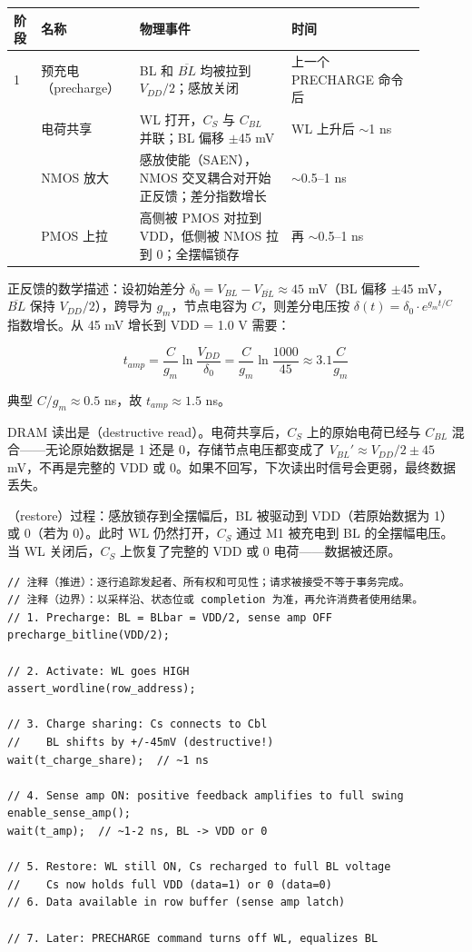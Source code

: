 \begin{longtable}{L{0.06\linewidth}L{0.2\linewidth}L{0.34\linewidth}L{0.3\linewidth}}
\toprule
阶段 & 名称 & 物理事件 & 时间 \\
 & 预充电（precharge） & BL 和 $\overline{BL}$ 均被拉到 $V_{DD}/2$；感放关闭 & 上一个 PRECHARGE 命令后 \\ & 电荷共享 & WL 打开，$C_S$ 与 $C_{BL}$ 并联；BL 偏移 $\pm$45 mV & WL 上升后 $\sim$1 ns \\ & NMOS 放大 & 感放使能（SAEN），NMOS 交叉耦合对开始正反馈；差分指数增长 & $\sim$0.5--1 ns \\ & PMOS 上拉 & 高侧被 PMOS 对拉到 VDD，低侧被 NMOS 拉到 0；全摆幅锁存 & 再 $\sim$0.5--1 ns \\
\bottomrule
\end{longtable}

正反馈的数学描述：设初始差分 $\delta_0 = V_{BL} - V_{\overline{BL}} \approx 45$ mV（BL 偏移 $\pm$45 mV，$\overline{BL}$ 保持 $V_{DD}/2$），跨导为 $g_m$，节点电容为 $C$，则差分电压按 $\delta(t) = \delta_0 \cdot e^{g_m t / C}$ 指数增长。从 45 mV 增长到 VDD = 1.0 V 需要：

$$t_{amp} = \frac{C}{g_m} \ln\frac{V_{DD}}{\delta_0} = \frac{C}{g_m} \ln\frac{1000}{45} \approx 3.1 \frac{C}{g_m}$$

典型 $C/g_m \approx 0.5$ ns，故 $t_{amp} \approx 1.5$ ns。


DRAM 读出是（destructive read）。电荷共享后，$C_S$ 上的原始电荷已经与 $C_{BL}$ 混合——无论原始数据是 1 还是 0，存储节点电压都变成了 $V_{BL}' \approx V_{DD}/2 \pm 45$ mV，不再是完整的 VDD 或 0。如果不回写，下次读出时信号会更弱，最终数据丢失。

（restore）过程：感放锁存到全摆幅后，BL 被驱动到 VDD（若原始数据为 1）或 0（若为 0）。此时 WL 仍然打开，$C_S$ 通过 M1 被充电到 BL 的全摆幅电压。当 WL 关闭后，$C_S$ 上恢复了完整的 VDD 或 0 电荷——数据被还原。

\begin{lstlisting}[numbers=none,caption={DRAM 读出-回写时序（伪代码）}]
// 注释（推进）：逐行追踪发起者、所有权和可见性；请求被接受不等于事务完成。
// 注释（边界）：以采样沿、状态位或 completion 为准，再允许消费者使用结果。
// 1. Precharge: BL = BLbar = VDD/2, sense amp OFF
precharge_bitline(VDD/2);

// 2. Activate: WL goes HIGH
assert_wordline(row_address);

// 3. Charge sharing: Cs connects to Cbl
//    BL shifts by +/-45mV (destructive!)
wait(t_charge_share);  // ~1 ns

// 4. Sense amp ON: positive feedback amplifies to full swing
enable_sense_amp();
wait(t_amp);  // ~1-2 ns, BL -> VDD or 0

// 5. Restore: WL still ON, Cs recharged to full BL voltage
//    Cs now holds full VDD (data=1) or 0 (data=0)
// 6. Data available in row buffer (sense amp latch)

// 7. Later: PRECHARGE command turns off WL, equalizes BL
\end{lstlisting}


